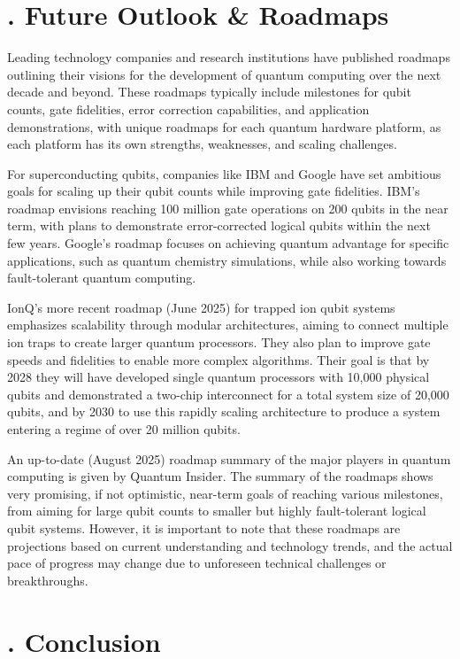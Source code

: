 \documentclass{elbioimp2}
\begin{document}
\section{. Future Outlook \& Roadmaps}

Leading technology companies and research institutions have published roadmaps outlining their visions for the development of quantum computing over the next decade and beyond. These roadmaps typically include milestones for qubit counts, gate fidelities, error correction capabilities, and application demonstrations, with unique roadmaps for each quantum hardware platform, as each platform has its own strengths, weaknesses, and scaling challenges.

For superconducting qubits, companies like IBM and Google have set ambitious goals for scaling up their qubit counts while improving gate fidelities. IBM's roadmap envisions reaching 100 million gate operations on 200 qubits in the near term, with plans to demonstrate error-corrected logical qubits within the next few years. Google's roadmap focuses on achieving quantum advantage for specific applications, such as quantum chemistry simulations, while also working towards fault-tolerant quantum computing.

IonQ's more recent roadmap (June 2025) for trapped ion qubit systems emphasizes scalability through modular architectures, aiming to connect multiple ion traps to create larger quantum processors. They also plan to improve gate speeds and fidelities to enable more complex algorithms. Their goal is that by 2028 they will have developed single quantum processors with 10,000 physical qubits and demonstrated a two-chip interconnect for a total system size of 20,000 qubits\cite{ionq2025}, and by 2030 to use this rapidly scaling architecture to produce a system entering a regime of over 20 million qubits.

An up-to-date (August 2025) roadmap summary of the major players in quantum computing is given by Quantum Insider\cite{quantuminsider2025}. The summary of the roadmaps shows very promising, if not optimistic, near-term goals of reaching various milestones, from aiming for large qubit counts to smaller but highly fault-tolerant logical qubit systems. However, it is important to note that these roadmaps are projections based on current understanding and technology trends, and the actual pace of progress may change due to unforeseen technical challenges or breakthroughs.

\section{. Conclusion}
\end{document}
